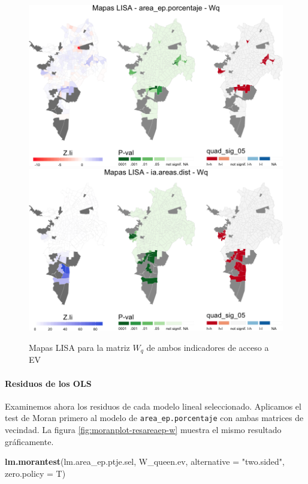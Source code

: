 \documentclass[12pt,]{book}
\newenvironment{Shaded}{\begin{snugshade}}{\end{snugshade}}
\newcommand{\KeywordTok}[1]{\textcolor[rgb]{0.13,0.29,0.53}{\textbf{#1}}}
\newcommand{\DataTypeTok}[1]{\textcolor[rgb]{0.13,0.29,0.53}{#1}}
\newcommand{\StringTok}[1]{\textcolor[rgb]{0.31,0.60,0.02}{#1}}
\newcommand{\NormalTok}[1]{#1}
\let\oldparagraph\paragraph
\renewcommand{\paragraph}[1]{\oldparagraph{#1}\mbox{}}
\begin{document}
\begin{figure}
\includegraphics[width=1\linewidth]{tesis-unigis_files/figure-latex/mapas-lisa-ev-wq-1} \includegraphics[width=1\linewidth]{tesis-unigis_files/figure-latex/mapas-lisa-ev-wq-2} \caption{Mapas LISA para la matriz $W_q$ de ambos indicadores de acceso a EV}\label{fig:mapas-lisa-ev-wq}
\end{figure}

\paragraph{Residuos de los OLS}\label{residuos-de-los-ols-1}

Examinemos ahora los residuos de cada modelo lineal seleccionado.
Aplicamos el test de Moran primero al modelo de
\texttt{area\_ep.porcentaje} con ambas matrices de vecindad. La figura
\ref{fig:moranplot-resareaep-w} muestra el mismo resultado gráficamente.

\begin{Shaded}
\begin{Highlighting}[]
\KeywordTok{lm.morantest}\NormalTok{(lm.area_ep.ptje.sel, W_queen.ev, }\DataTypeTok{alternative =} \StringTok{"two.sided"}\NormalTok{, }\DataTypeTok{zero.policy =}\NormalTok{ T)}
\end{Highlighting}
\end{Shaded}
\end{document}
